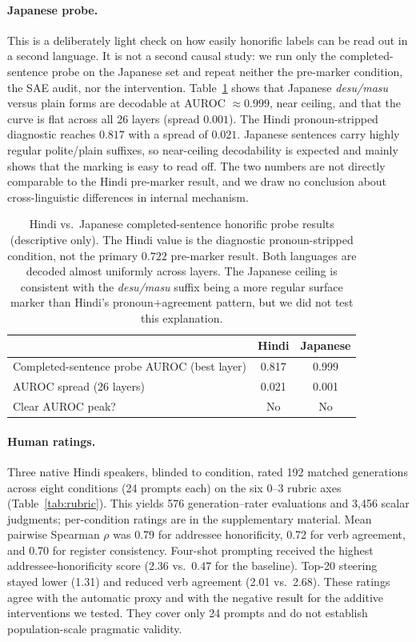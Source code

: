 \documentclass[11pt]{article}
\begin{document}
\paragraph{Japanese probe.}
This is a deliberately light check on how easily honorific labels can be read
out in a second language. It is not a second causal study: we run only the
completed-sentence probe on the Japanese set and repeat neither the pre-marker
condition, the SAE audit, nor the intervention. Table~\ref{tab:japanese} shows
that Japanese \textit{desu/masu} versus plain forms are decodable at AUROC
${\approx}0.999$, near ceiling, and that the curve is flat across all 26 layers
(spread $0.001$). The Hindi pronoun-stripped diagnostic reaches $0.817$ with a
spread of $0.021$. Japanese sentences carry highly regular polite/plain suffixes,
so near-ceiling decodability is expected and mainly shows that the marking is
easy to read off. The two numbers are not directly comparable to the Hindi
pre-marker result, and we draw no conclusion about cross-linguistic differences
in internal mechanism.

\begin{table}[t]
\centering
\scriptsize
\setlength\tabcolsep{2pt}
\begin{tabular}{p{2.7cm}cc}
\toprule
& \textbf{Hindi} & \textbf{Japanese} \\
\midrule
Completed-sentence probe AUROC (best layer) & 0.817 & 0.999 \\
AUROC spread (26 layers)   & 0.021 & 0.001 \\
Clear AUROC peak?          & No & No \\
\bottomrule
\end{tabular}
\caption{Hindi vs.\ Japanese completed-sentence honorific probe results
  (descriptive only). The Hindi value is the diagnostic pronoun-stripped
  condition, not the primary $0.722$ pre-marker result. Both languages are
  decoded almost uniformly across layers. The Japanese ceiling is consistent
  with the \textit{desu/masu} suffix being a more regular surface marker than
  Hindi's pronoun${+}$agreement pattern, but we did not test this explanation.}
\label{tab:japanese}
\end{table}

\paragraph{Human ratings.}
Three native Hindi speakers, blinded to condition, rated 192 matched
generations across eight conditions (24 prompts each) on the six 0--3 rubric
axes (Table~\ref{tab:rubric}). This yields 576 generation--rater evaluations and
3,456 scalar judgments; per-condition ratings are in the supplementary material.
Mean pairwise Spearman $\rho$ was 0.79 for addressee honorificity, 0.72 for
verb agreement, and 0.70 for register consistency. Four-shot prompting received
the highest addressee-honorificity score (2.36 vs.\ 0.47 for the baseline).
Top-20 steering stayed lower (1.31) and reduced verb agreement (2.01 vs.\ 2.68).
These ratings agree with the automatic proxy and with the negative result for
the additive interventions we tested. They cover only 24 prompts and do not
establish population-scale pragmatic validity.
\end{document}
